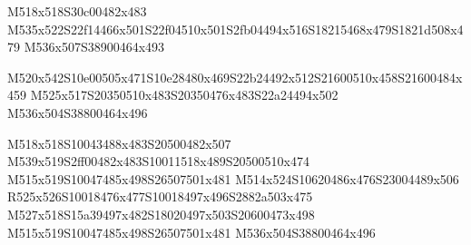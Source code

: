 \documentclass{article}
\begin{document}
\begin{multicols}{5}
\begin{center}
M518x518S30c00482x483 %
M535x522S22f14466x501S22f04510x501S2fb04494x516S18215468x479S1821d508x479 %
M536x507S38900464x493 %

M520x542S10e00505x471S10e28480x469S22b24492x512S21600510x458S21600484x459 %
M525x517S20350510x483S20350476x483S22a24494x502 %
M536x504S38800464x496 %

M518x518S10043488x483S20500482x507 %
M539x519S2ff00482x483S10011518x489S20500510x474 %
M515x519S10047485x498S26507501x481 %
M514x524S10620486x476S23004489x506 %
R525x526S10018476x477S10018497x496S2882a503x475 %
M527x518S15a39497x482S18020497x503S20600473x498 %
M515x519S10047485x498S26507501x481 %
M536x504S38800464x496 %

\end{center}
\end{multicols}
\end{document}

